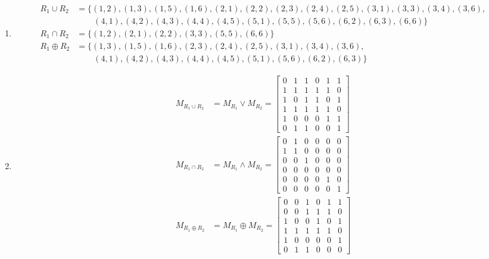 \begin{Solution}{8.4}
\ \\
\begin{enumerate}[label=(\alph*)]
   \item \begin{align*}
                R_1 \cup R_2 &=\{(1,2),(1,3),(1,5),(1,6),(2,1),(2,2),(2,3),(2,4),(2,5),(3,1),(3,3),(3,4),(3,6),\\
                                             &\phantom{=\{\ }(4,1),(4,2),(4,3),(4,4),(4,5),(5,1),(5,5),(5,6),(6,2),(6,3),(6,6) \} \\
                  R_1 \cap R_2 &= \{(1,2),(2,1),(2,2),(3,3),(5,5),(6,6) \} \\
                 R_1 \oplus R_2 &= \{ (1,3),(1,5),(1,6),(2,3),(2,4),(2,5),(3,1),(3,4),(3,6),\\
                                             &\phantom{=\{\ }(4,1),(4,2),(4,3),(4,4),(4,5),(5,1),(5,6),(6,2),(6,3)\}
            \end{align*}

   \item
        \begin{align*}
             M_{R_1 \cup R_2} &= M_{R_1} \lor M_{R_2} =
                   \begin{bmatrix}
                      0&1&1&0&1&1 \\
                      1&1&1&1&1&0 \\
                      1&0&1&1&0&1 \\
                      1&1&1&1&1&0 \\
                      1&0&0&0&1&1 \\
                      0&1&1&0&0&1
                    \end{bmatrix} \\
            M_{R_1 \cap R_2} &= M_{R_1} \land M_{R_2} =
                    \begin{bmatrix}
                      0&1&0&0&0&0 \\
                      1&1&0&0&0&0 \\
                      0&0&1&0&0&0 \\
                      0&0&0&0&0&0 \\
                      0&0&0&0&1&0 \\
                      0&0&0&0&0&1
                    \end{bmatrix} \\
            M_{R_1 \oplus R_2} &= M_{R_1} \oplus M_{R_2} =
               \begin{bmatrix}
                      0&0&1&0&1&1 \\
                      0&0&1&1&1&0 \\
                      1&0&0&1&0&1 \\
                      1&1&1&1&1&0 \\
                      1&0&0&0&0&1 \\
                      0&1&1&0&0&0
                \end{bmatrix} \\
       \end{align*}
\end{enumerate}

\end{Solution}
